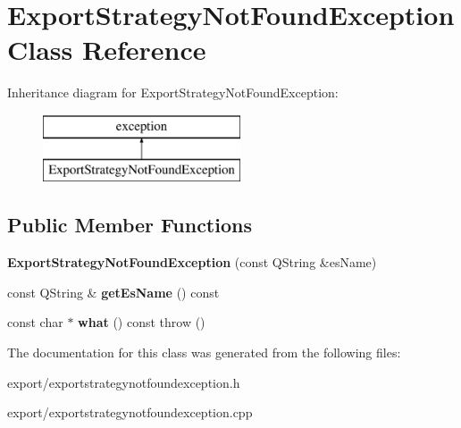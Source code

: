\hypertarget{class_export_strategy_not_found_exception}{\section{Export\-Strategy\-Not\-Found\-Exception Class Reference}
\label{class_export_strategy_not_found_exception}
}
Inheritance diagram for Export\-Strategy\-Not\-Found\-Exception\-:\begin{figure}[H]
\begin{center}
\leavevmode
\includegraphics[height=2.000000cm]{class_export_strategy_not_found_exception}
\end{center}
\end{figure}
\subsection*{Public Member Functions}
\begin{DoxyCompactItemize}
\item 
\hypertarget{class_export_strategy_not_found_exception_acc07b965f92a3ac386ee563c07af623e}{{\bfseries Export\-Strategy\-Not\-Found\-Exception} (const Q\-String \&es\-Name)}\label{class_export_strategy_not_found_exception_acc07b965f92a3ac386ee563c07af623e}

\item 
\hypertarget{class_export_strategy_not_found_exception_a94769567843696ef8a2e546dbd41b591}{const Q\-String \& {\bfseries get\-Es\-Name} () const }\label{class_export_strategy_not_found_exception_a94769567843696ef8a2e546dbd41b591}

\item 
\hypertarget{class_export_strategy_not_found_exception_ae28b18c809c6727fc4af0b2bfaa29871}{const char $\ast$ {\bfseries what} () const   throw ()}\label{class_export_strategy_not_found_exception_ae28b18c809c6727fc4af0b2bfaa29871}

\end{DoxyCompactItemize}


The documentation for this class was generated from the following files\-:\begin{DoxyCompactItemize}
\item 
export/exportstrategynotfoundexception.\-h\item 
export/exportstrategynotfoundexception.\-cpp\end{DoxyCompactItemize}
